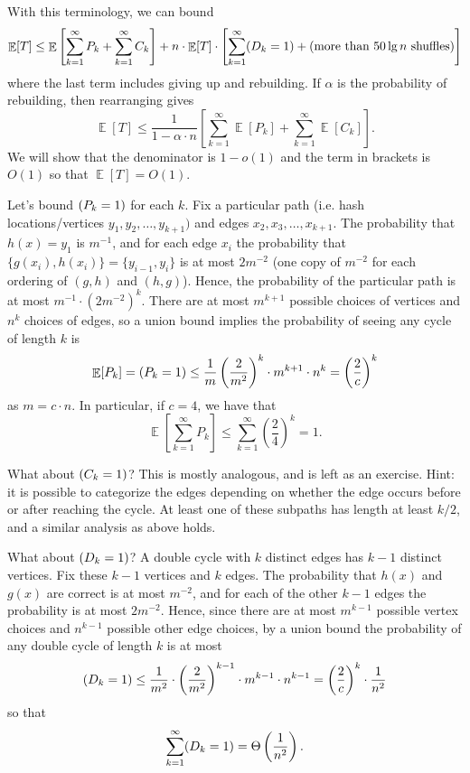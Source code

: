 \documentclass[11pt]{article}
\DeclareMathOperator*{\E}{\mathbb{E}}
\let\Pr\relax
\DeclareMathOperator*{\Pr}{\mathbb{P}}
\begin{document}
With this terminology, we can bound
\[
\E[T] \leq \E\left[\sum_{k=1}^{\infty} P_k + \sum_{k=1}^{\infty} C_k\right] +
n\cdot \E[T] \cdot \left[\sum_{k=1}^{\infty} \Pr(D_k = 1)
+ \Pr(\text{more than $50\lg n$ shuffles})\right]
\]
where the last term includes giving up and rebuilding. If $\alpha$ is the
probability of rebuilding, then rearranging gives
\[\E[T] \leq \frac{1}{1 - \alpha\cdot n} \left[\sum_{k=1}^\infty
\E[P_k] + \sum_{k=1}^{\infty} \E[C_k]\right].
\]
We will show that the denominator is $1 - o(1)$ and the term in brackets is
$O(1)$ so that $\E[T] = O(1)$.

Let's bound $\Pr(P_k = 1)$ for each $k$. Fix a particular path (i.e. hash
locations/vertices $y_1, y_2, \dotsc, y_{k+1})$ and edges $x_2, x_3, \dotsc,
x_{k+1}$. The probability that $h(x) = y_1$ is $m^{-1}$, and for each edge $x_i$
the probability that $\{g(x_i), h(x_i)\} = \{y_{i-1}, y_i\}$ is at most
$2m^{-2}$ (one copy of $m^{-2}$ for each ordering of $(g, h)$ and $(h, g)$).
Hence, the probability of the particular path is at most $m^{-1}\cdot
(2m^{-2})^k$. There are at most $m^{k+1}$ possible choices of vertices and $n^k$
choices of edges, so a union bound implies the probability of seeing any cycle
of length $k$ is
\[\E[P_k] = \Pr(P_k = 1) \leq \frac{1}{m}\left(\frac{2}{m^2}\right)^k\cdot
m^{k+1}\cdot n^k = \left(\frac{2}{c}\right)^k\]
as $m = c\cdot n$. In particular, if $c = 4$, we have that
\[\E\left[\sum_{k=1}^{\infty} P_k \right] \leq \sum_{k=1}^{\infty}
\left(\frac{2}{4}\right)^k = 1.\]

What about $\Pr(C_k = 1)$? This is mostly analogous, and is left as an exercise.
Hint: it is possible to categorize the edges depending on whether the edge
occurs before or after reaching the cycle. At least one of these subpaths has
length at least $k/2$, and a similar analysis as above holds.

What about $\Pr(D_k = 1)$? A double cycle with $k$ distinct edges has
$k - 1$ distinct vertices. Fix these $k - 1$ vertices and $k$ edges. The
probability that $h(x)$ and $g(x)$ are correct is at most $m^{-2}$, and for
each of the other $k - 1$ edges the probability is at most $2m^{-2}$. Hence,
since there are at most $m^{k-1}$ possible vertex choices and $n^{k-1}$ possible
other edge choices, by a union bound the probability of any double cycle of
length $k$ is at most
\[\Pr(D_k = 1) \leq \frac{1}{m^2}\cdot \left(\frac{2}{m^2}\right)^{k-1}\cdot
m^{k-1}\cdot n^{k-1} = \left(\frac{2}{c}\right)^k \cdot \frac{1}{n^2}\]
so that
\[\sum_{k=1}^{\infty} \Pr(D_k = 1) = \Theta\left(\frac{1}{n^2}\right).\]
\end{document}
